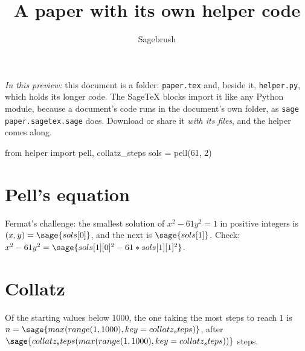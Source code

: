\documentclass{article}
\title{A paper with its own helper code}
\author{Sagebrush}
\date{}
\begin{document}
\maketitle

\emph{In this preview:} this document is a folder: \texttt{paper.tex} and, beside it, \texttt{helper.py}, which
holds its longer code. The SageTeX blocks import it like any Python module, because a document's code runs in the
document's own folder, as \texttt{sage paper.sagetex.sage} does. Download or share it \emph{with its files}, and
the helper comes along.

\begin{sagesilent}
from helper import pell, collatz_steps
sols = pell(61, 2)
\end{sagesilent}

\section*{Pell's equation}
Fermat's challenge: the smallest solution of $x^2 - 61y^2 = 1$ in positive integers is
$(x, y) = \sage{sols[0]}$, and the next is $\sage{sols[1]}$.
Check: $x^2 - 61 y^2 = \sage{sols[1][0]^2 - 61*sols[1][1]^2}$.

\section*{Collatz}
Of the starting values below $1000$, the one taking the most steps to reach $1$ is
$n = \sage{max(range(1, 1000), key=collatz_steps)}$, after
$\sage{collatz_steps(max(range(1, 1000), key=collatz_steps))}$ steps.
\end{document}
